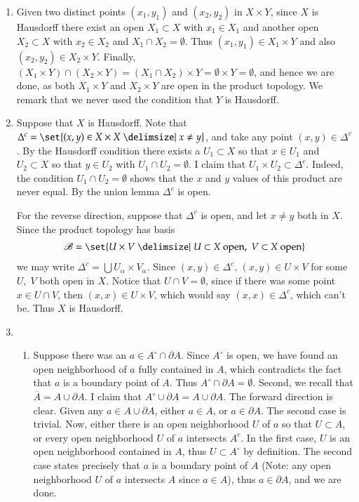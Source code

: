 \documentclass[12pt]{article}
\theoremstyle{definitionstyle}
\begin{document}
\begin{enumerate}[leftmargin=\labelsep]
		\item Given two distinct points $(x_1, y_1)$ and $(x_2, y_2)$ in $X \times Y$, since $X$ is Hausdorff there exist an open $X_1 \subset X$ with $x_1 \in X_1$ and another open $X_2 \subset X$ with $x_2 \in X_2$ and $X_1 \cap X_2 = \emptyset$. Thus $(x_1, y_1) \in X_1 \times Y$ and also $(x_2, y_2) \in X_2 \times Y$. Finally, $(X_1 \times Y) \cap (X_2 \times Y) = (X_1 \cap X_2) \times Y = \emptyset \times Y = \emptyset$, and hence we are done, as both $X_1 \times Y$ and $X_2 \times Y$ are open in the product topology. We remark that we never used the condition that $Y$ is Hausdorff.
		
		\item Suppose that $X$ is Hausdorff. Note that $\Delta^c = \set{(x, y) \in X \times X \given x \neq y}$, and take any point $(x, y) \in \Delta^c$. By the Hausdorff condition there exists a $U_1 \subset X$ so that $x \in U_1$ and $U_2 \subset X$ so that $y \in U_2$ with $U_1 \cap U_2 = \emptyset$. I claim that $U_1 \times U_2 \subset \Delta^c$. Indeed, the condition $U_1 \cap U_2 = \emptyset$ shows that the $x$ and $y$ values of this product are never equal. By the union lemma $\Delta^c$ is open.
		
		For the reverse direction, suppose that $\Delta^c$ is open, and let $x \neq y$ both in $X$. Since the product topology has basis
		\begin{align*}
			\mathscr{B} = \set{U \times V \given U \subset X \text{ open}, \; V \subset X \text{ open}}
		\end{align*}
		we may write $\Delta^c = \bigcup U_\alpha \times V_\alpha$. Since $(x, y) \in \Delta^c$, $(x, y) \in U \times V$ for some $U, \; V$ both open in $X$. Notice that $U \cap V = \emptyset$, since if there was some point $x \in U \cap V$, then $(x, x) \in U \times V$, which would say $(x, x) \in \Delta^c$, which can't be. Thus $X$ is Hausdorff.
		
		\item \begin{enumerate}
			\item Suppose there was an $a \in A^{\circ} \cap \partial A$. Since $A^{\circ}$ is open, we have found an open neighborhood of $a$ fully contained in $A$, which contradicts the fact that $a$ is a boundary point of $A$. Thus $A^{\circ} \cap \partial A = \emptyset$. Second, we recall that $\overline{A} = A \cup \partial A$. I claim that $A^{\circ} \cup \partial A = A \cup \partial A$. The forward direction is clear. Given any $a \in A \cup \partial A$, either $a \in A$, or $a \in \partial A$. The second case is trivial. Now, either there is an open neighborhood $U$ of $a$ so that $U \subset A$, or every open neighborhood $U$ of $a$ intersects $A^c$. In the first case, $U$ is an open neighborhood contained in $A$, thus $U \subset A^{\circ}$ by definition. The second case states precisely that $a$ is a boundary point of $A$ (Note: any open neighborhood $U$ of $a$ intersects $A$ since $a \in A$), thus $a \in \partial A$, and we are done.
			

\end{enumerate}
\end{enumerate}
\end{document}
